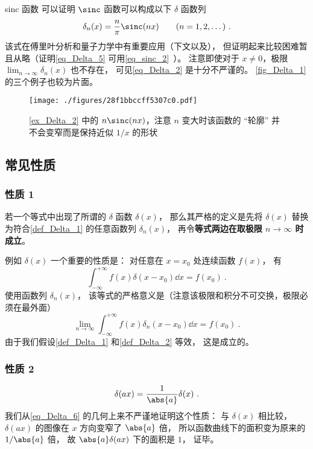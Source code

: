\begin{example}{sinc 函数}\label{ex_Delta_2}
可以证明 $\sinc$ 函数可以构成以下 $\delta$ 函数列
\begin{equation}\label{eq_Delta_10}
\delta_n(x) = \frac{n}{\pi}\sinc(n x) \qquad (n = 1, 2, \dots)~.
\end{equation}
该式在傅里叶分析和量子力学中有重要应用（下文以及\cite{Arfken}）， 但证明起来比较困难暂且从略（证明\autoref{eq_Delta_5} 可用\autoref{eq_sinc_2}~）。 注意即使对于 $x \ne 0$，极限 $\lim_{n\to\infty} \delta_n(x)$ 也不存在， 可见\autoref{eq_Delta_2} 是十分不严谨的。 \autoref{fig_Delta_1} 的三个例子也较为片面。
\end{example}
\begin{figure}[ht]
\centering
\texttt{[image: ./figures/28f1bbccff5307c0.pdf]}
\caption{\autoref{ex_Delta_2} 中的 $n\sinc(n x)$，注意 $n$ 变大时该函数的 “轮廓” 并不会变窄而是保持近似 $1/x$ 的形状} \label{fig_Delta_2}
\end{figure}

\subsection{常见性质}
\subsubsection{性质 1}
若一个等式中出现了所谓的 $\delta$ 函数 $\delta(x)$， 那么其严格的定义是先将 $\delta(x)$ 替换为符合\autoref{def_Delta_1} 的任意函数列 $\delta_n(x)$， 再令\textbf{等式两边在取极限 $n\to\infty$ 时成立}。

例如 $\delta(x)$ 一个重要的性质是： 对任意在 $x = x_0$ 处连续函数 $f(x)$， 有
\begin{equation}\label{eq_Delta_7}
\int_{-\infty}^{+\infty} f(x) \delta(x - x_0) \dd{x}= f(x_0)~.
\end{equation}
使用函数列 $\delta_n(x)$， 该等式的严格意义是（注意该极限和积分不可交换，极限必须在最外面）
\begin{equation}\label{eq_Delta_11}
\lim_{n\to\infty}\int_{-\infty}^{+\infty} f(x) \delta_n(x - x_0) \dd{x}= f(x_0)~.
\end{equation}
由于我们假设\autoref{def_Delta_1} 和\autoref{def_Delta_2} 等效， 这是成立的。

\subsubsection{性质 2}
\begin{equation}\label{eq_Delta_1}
\delta(ax) = \frac{1}{\abs{a}} \delta(x)~.
\end{equation}
我们从\autoref{eq_Delta_6} 的几何上来不严谨地证明这个性质： 与 $\delta(x)$ 相比较， $\delta(ax)$ 的图像在 $x$ 方向变窄了 $\abs{a}$ 倍， 所以函数曲线下的面积变为原来的 $1/\abs{a}$ 倍， 故 $\abs{a}\delta(ax)$ 下的面积是 $1$， 证毕。

